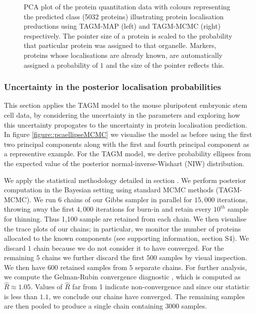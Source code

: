 \documentclass[12pt,english]{article}\usepackage[]{graphicx}\usepackage[]{color}
\newenvironment{knitrout}{}{} %
\begin{document}
\begin{figure}[p]
\begin{subfigure}[t]{0.5\textwidth}
\begin{knitrout}
\end{knitrout}
    \end{subfigure}%
  \centering
  \caption{PCA plot of the protein quantitation data with colours
    representing the predicted class (5032 proteins) illustrating
    protein localisation preductions using TAGM-MAP (left) and
    TAGM-MCMC (right) respectively. The pointer size of a protein is
    scaled to the probability that particular protein was assigned to
    that organelle. Markers, proteins whose localisations are already
    known, are automatically assigned a probability of $1$ and the
    size of the pointer reflects this.}
  \label{fig:assignmentPCA} %
\end{figure}


\subsubsection*{Uncertainty in the posterior localisation probabilities}

This section applies the TAGM model to the mouse pluripotent embryonic
stem cell data, by considering the uncertainty in the parameters and
exploring how this uncertainty propogates to the uncertainty in
protein localisation prediction.  In figure
\ref{figure::pcaellipseMCMC} we visualise the model as before using
the first two principal components along with the first and fourth
principal component as a representive example.  For the TAGM model, we
derive probability ellipses from the expected value of the posterior
normal-inverse-Wishart (NIW) distribution.

We apply the statistical methodology detailed in section
.  We perform posterior computation in the
Bayesian setting using standard MCMC methods (TAGM-MCMC).  We run $6$
chains of our Gibbs sampler in parallel for $15,000$ iterations,
throwing away the first $4,000$ iterations for burn-in and retain
every $10^{th}$ sample for thinning.  Thus 1,100 sample are retained
from each chain. We then visualise the trace plots of our chains; in
particular, we monitor the number of proteins allocated to the known
components (see supporting information, section S4). We discard $1$ chain because
we do not consider it to have converged.  For the remaining $5$
chains we further discard the first $500$ samples by visual
inspection.  We then have $600$ retained samples from $5$ separate
chains. For further analysis, we compute the Gelman-Rubin convergence
diagnostic \citep{Gelman:1992, Brooks:1998}, which is computed as
$\hat{R} \approx 1.05$.  Values of $\hat{R}$ far from 1 indicate
non-convergence and since our statistic is less than $1.1$, we
conclude our chains have converged. The remaining samples are then
pooled to produce a single chain containing $3000$ samples.
\end{document}
